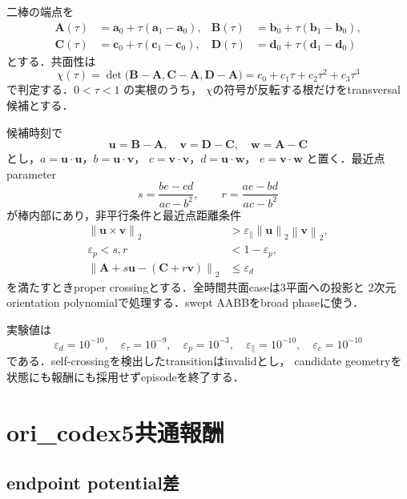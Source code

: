 \documentclass[a4paper,11pt]{ltjsarticle}
\newcommand{\norm}[1]{\left\lVert #1\right\rVert}
\begin{document}
二棒の端点を
\begin{align}
 \bm A(\tau)&=\bm a_0+\tau(\bm a_1-\bm a_0),&
 \bm B(\tau)&=\bm b_0+\tau(\bm b_1-\bm b_0),\\
 \bm C(\tau)&=\bm c_0+\tau(\bm c_1-\bm c_0),&
 \bm D(\tau)&=\bm d_0+\tau(\bm d_1-\bm d_0)
\end{align}
とする．共面性は
\begin{equation}
 \chi(\tau)=
 \det\bigl(\bm B-\bm A,\bm C-\bm A,\bm D-\bm A\bigr)
 =c_0+c_1\tau+c_2\tau^2+c_3\tau^3
 \label{eq:coplanar}
\end{equation}
で判定する．$0<\tau<1$ の実根のうち，
$\chi$の符号が反転する根だけをtransversal候補とする．

候補時刻で
\begin{equation}
 \bm u=\bm B-\bm A,\quad
 \bm v=\bm D-\bm C,\quad
 \bm w=\bm A-\bm C
\end{equation}
とし，$a=\bm u\cdot\bm u$，$b=\bm u\cdot\bm v$，
$c=\bm v\cdot\bm v$，$d=\bm u\cdot\bm w$，
$e=\bm v\cdot\bm w$ と置く．最近点parameter
\begin{equation}
 s=\frac{be-cd}{ac-b^2},\qquad
 r=\frac{ae-bd}{ac-b^2}
\end{equation}
が棒内部にあり，非平行条件と最近点距離条件
\begin{align}
 \norm{\bm u\times\bm v}_2
 &>\varepsilon_\parallel\norm{\bm u}_2\norm{\bm v}_2,\\
 \varepsilon_p<s,r&<1-\varepsilon_p,\\
 \norm{\bm A+s\bm u-(\bm C+r\bm v)}_2
 &\le\varepsilon_d
\end{align}
を満たすときproper crossingとする．全時間共面caseは3平面への投影と
2次元orientation polynomialで処理する．swept AABBをbroad phaseに使う．

実験値は
\begin{equation}
 \varepsilon_d=10^{-10},\quad
 \varepsilon_\tau=10^{-9},\quad
 \varepsilon_p=10^{-3},\quad
 \varepsilon_\parallel=10^{-10},\quad
 \varepsilon_c=10^{-10}
\end{equation}
である．self-crossingを検出したtransitionはinvalidとし，
candidate geometryを状態にも報酬にも採用せずepisodeを終了する．

\section{ori\_codex5共通報酬}
\label{sec:reward}

\subsection{endpoint potential差}
\end{document}
